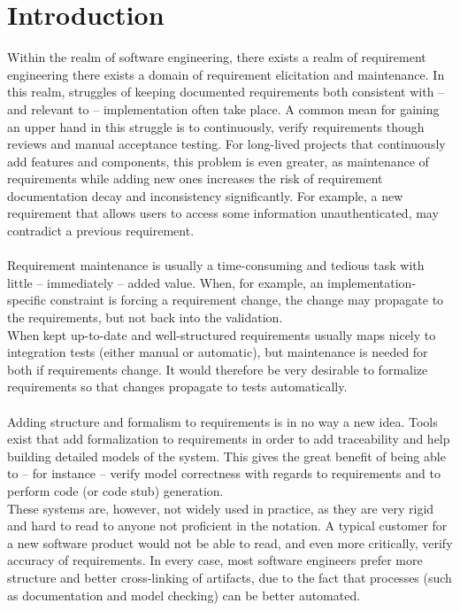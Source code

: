 \chapter{Introduction}


Within the realm of software engineering, there exists a realm of requirement engineering there exists a domain of requirement elicitation and maintenance. In this realm, struggles of keeping documented requirements both consistent with -- and relevant to -- implementation often take place. A common mean for gaining an upper hand in this struggle is to continuously, verify requirements though reviews and manual acceptance testing.
For long-lived projects that continuously add features and components, this problem is even greater, as maintenance of requirements while adding new ones increases the risk of requirement documentation decay and inconsistency significantly. For example, a new requirement that allows users to access some information unauthenticated, may contradict a previous requirement.\\\\
Requirement maintenance is usually a time-consuming and tedious task with little -- immediately -- added value. When, for example, an implementation-specific constraint is forcing a requirement change, the change may propagate to the requirements, but not back into the validation.\\
When kept up-to-date and well-structured requirements usually maps nicely to integration tests (either manual or automatic), but maintenance is needed for both if requirements change. It would therefore be very desirable to formalize requirements so that changes propagate to tests automatically.\\\\
Adding structure and formalism to requirements is in no way a new idea. Tools exist that add formalization to requirements in order to add traceability and help building detailed models of the system. This gives the great benefit of being able to -- for instance -- verify model correctness with regards to requirements and to perform code (or code stub) generation.\\
These systems are, however, not widely used in practice, as they are very rigid and hard to read to anyone not proficient in the notation. A typical customer for a new software product would not be able to read, and even more critically, verify accuracy of requirements. In every case, most software engineers prefer more structure and better cross-linking of artifacts, due to the fact that processes (such as documentation and model checking) can be better automated.\\\\
